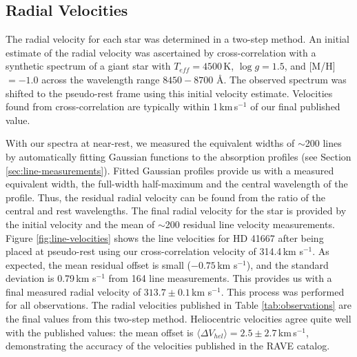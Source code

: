 \documentclass{emulateapj}
\begin{document}
\subsection{Radial Velocities}
\label{sec:radial-velocities}
The radial velocity for each star was determined in a two-step method. An initial estimate of the radial velocity was ascertained by cross-correlation with a synthetic spectrum of a giant star with $T_{eff} = 4500$\,K, $\log{g} = 1.5$, and [M/H] $= -1.0$ across the wavelength range $8450 - 8700$ \AA{}. The observed spectrum was shifted to the pseudo-rest frame using this initial velocity estimate. Velocities found from cross-correlation are typically within 1\,km\,s$^{-1}$ of our final published value.

With our spectra at near-rest, we measured the equivalent widths of $\sim$200 lines by automatically fitting Gaussian functions to the absorption profiles (see Section \ref{sec:line-measurements}). Fitted Gaussian profiles provide us with a measured equivalent width, the full-width half-maximum and the central wavelength of the profile. Thus, the residual radial velocity can be found from the ratio of the central and rest wavelengths. The final radial velocity for the star is provided by the initial velocity and the mean of $\sim$200 residual line velocity measurements. Figure \ref{fig:line-velocities} shows the line velocities for HD 41667 after being placed at pseudo-rest using our cross-correlation velocity of 314.4\,km s$^{-1}$. As expected, the mean residual offset is small ($-0.75$\,km s$^{-1}$), and the standard deviation is 0.79\,km s$^{-1}$ from 164 line measurements. This provides us with a final measured radial velocity of $313.7 \pm 0.1$\,km s$^{-1}$. This process was performed for all observations. The radial velocities published in Table \ref{tab:observations} are the final values from this two-step method. Heliocentric velocities agree quite well with the \citet{williams;et-al_2011} published values: the mean offset is $\langle\Delta{V_{hel}}\rangle = 2.5 \pm 2.7$\,km\,s$^{-1}$, demonstrating the accuracy of the velocities published in the RAVE catalog.
\end{document}
